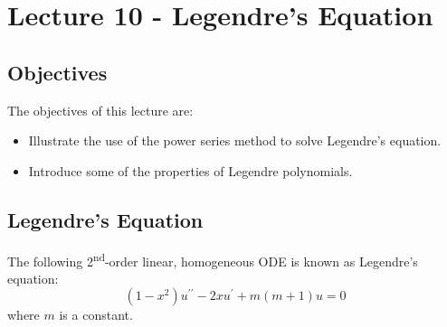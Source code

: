 \chapter{Lecture 10 - Legendre's Equation}
\label{ch:lec10}
\section{Objectives}
The objectives of this lecture are:
\begin{itemize}
\item Illustrate the use of the power series method to solve Legendre's equation. 
\item Introduce some of the properties of Legendre polynomials.
\end{itemize}

\section{Legendre's Equation}
The following 2\textsuperscript{nd}-order linear, homogeneous ODE is known as Legendre's equation:
\begin{equation}
\left(1-x^2 \right)u^{\prime \prime}-2xu^{\prime} + m(m+1)u = 0 
\label{eq:legendre}
\end{equation}
where $m$ is a constant.

